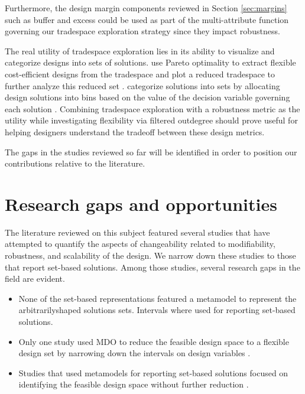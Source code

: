 Furthermore, the design margin components reviewed in Section \ref{sec:margins} such as buffer and excess could be used as part of the multi-attribute function governing our tradespace exploration strategy since they impact robustness.

The real utility of tradespace exploration lies in its ability to visualize and categorize designs into sets of solutions. \citeauthor{Viscito2009} use Pareto optimality to extract flexible cost-efficient designs from the tradespace and plot a reduced tradespace to further analyze this reduced set \cite{Viscito2009}. \citeauthor{Small2019} categorize solutions into sets by allocating design solutions into bins based on the value of the decision variable governing each solution \cite{Small2019}. Combining tradespace exploration with a robustness metric as the utility while investigating flexibility via filtered outdegree should prove useful for helping designers understand the tradeoff between these design metrics.

The gaps in the studies reviewed so far will be identified in order to position our contributions relative to the literature.

\section{Research gaps and opportunities}
\label{sec:bgsummary}

The literature reviewed on this subject featured several studies that have attempted to quantify the aspects of changeability related to modifiability, robustness, and scalability of the design. We narrow down these studies to those that report set-based solutions. Among those studies, several research gaps in the field are evident.

\begin{itemize}
	\item None of the set-based representations featured a metamodel to represent the arbitrarily\-shaped solutions sets. Intervals where used for reporting set-based solutions.
	\item Only one study used \ac{MDO} to reduce the feasible design space to a flexible design set by narrowing down the intervals on design variables \cite{Hannapel2014}.
	\item Studies that used metamodels for reporting set-based solutions focused on identifying the feasible design space without further reduction \cite{Shahan2012,Yannou2003}.
\end{itemize}


